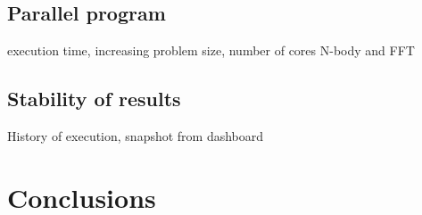 \documentclass[12pt,a4paper]{report}
\begin{document}
\section{Parallel program}
execution time, increasing problem size, number of cores
N-body and FFT
\section{Stability of results}
History of execution, snapshot from dashboard

\chapter{Conclusions}


\appendix





\end{document}
